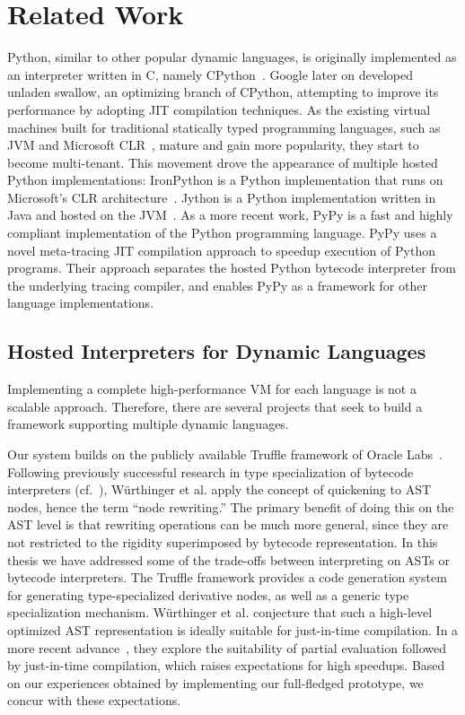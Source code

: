 \chapter{Related Work}
\label{chp:ch8-related-work}

Python, similar to other popular dynamic languages, is originally implemented as an interpreter written in C, namely CPython~\cite{python}.
Google later on developed unladen swallow, an optimizing branch of CPython, attempting to improve its performance by adopting JIT compilation techniques.
As the existing virtual machines built for traditional statically typed programming languages, such as JVM and Microsoft CLR~\cite{Kennedy+2001,Gough+2001,kilgore2002open}, mature and gain more popularity, they start to become multi-tenant.
This movement drove the appearance of multiple hosted Python implementations:
IronPython is a Python implementation that runs on Microsoft's CLR architecture~\cite{hugunin2004ironpython}.
Jython is a Python implementation written in Java and hosted on the JVM~\cite{jython}.
As a more recent work, PyPy\cite{Rigo2006,bolz.etal09,bolz.etal+15} is a fast and highly compliant implementation of the Python programming language.
PyPy uses a novel meta-tracing JIT compilation approach to speedup execution of Python programs.
Their approach separates the hosted Python bytecode interpreter from the underlying tracing compiler, and enables PyPy as a framework for other language implementations.

\section{Hosted Interpreters for Dynamic Languages}

Implementing a complete high-performance VM for each language is not a scalable approach.
Therefore, there are several projects that seek to build a framework supporting multiple dynamic languages.

Our system builds on the publicly available Truffle framework of Oracle Labs~\cite{Wurthinger+12}.
Following previously successful research in type specialization of bytecode interpreters (cf.~\cite{Brunthaler2010inca,Brunthaler2010quickening,williams.etal+10}), W\"{u}rthinger et al. apply the concept of quickening to AST nodes, hence the term ``node rewriting.''
The primary benefit of doing this on the AST level is that rewriting operations can be much more general, since they are not restricted to the rigidity superimposed by bytecode representation.
In this thesis we have addressed some of the trade-offs between interpreting on ASTs or bytecode interpreters.
The Truffle framework provides a code generation system for generating type-specialized derivative nodes, as well as a generic type specialization mechanism.
W\"{u}rthinger et al. conjecture that such a high-level optimized AST representation is ideally suitable for just-in-time compilation.
In a more recent advance~\cite{Wurthinger+13}, they explore the suitability of partial evaluation followed by just-in-time compilation, which raises expectations for high speedups.
Based on our experiences obtained by implementing our full-fledged prototype, we concur with these expectations.

